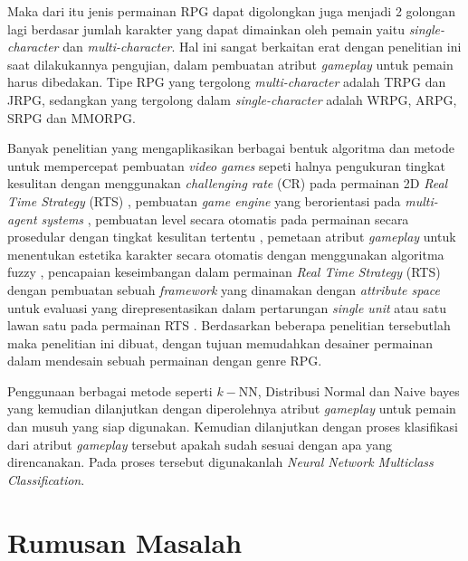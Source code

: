 Maka dari itu jenis permainan RPG dapat digolongkan juga menjadi 2 golongan lagi berdasar jumlah karakter yang dapat dimainkan oleh pemain yaitu \textit{single-character} dan \textit{multi-character}. Hal ini sangat berkaitan erat dengan penelitian ini saat dilakukannya pengujian, dalam pembuatan atribut \textit{gameplay} untuk pemain harus dibedakan. Tipe RPG yang tergolong \textit{multi-character} adalah TRPG dan JRPG, sedangkan yang tergolong dalam \textit{single-character} adalah WRPG, ARPG, SRPG dan MMORPG.
\vspace{1ex}

Banyak penelitian yang mengaplikasikan berbagai bentuk algoritma dan metode untuk mempercepat pembuatan \textit{video games} sepeti halnya pengukuran tingkat kesulitan dengan menggunakan \textit{challenging rate} (CR) pada permainan 2D \textit{Real Time Strategy} (RTS) \citep{Christyowidiasmoro2016}, pembuatan \textit{game engine} yang berorientasi pada \textit{multi-agent systems} \citep{Marin-Lora2020}, pembuatan level secara otomatis pada permainan secara prosedular dengan tingkat kesulitan tertentu \citep{Wu2018}, pemetaan atribut \textit{gameplay} untuk menentukan estetika karakter secara otomatis dengan menggunakan algoritma fuzzy \citep{camelo2014}, pencapaian keseimbangan dalam permainan \textit{Real Time Strategy} (RTS) dengan pembuatan sebuah \textit{framework} yang dinamakan dengan \textit{attribute space} untuk evaluasi yang direpresentasikan dalam pertarungan \textit{single unit} atau satu lawan satu pada permainan RTS \citep{Bangay2014}. Berdasarkan beberapa penelitian tersebutlah maka penelitian ini dibuat, dengan tujuan memudahkan desainer permainan dalam mendesain sebuah permainan dengan genre RPG.
\vspace{1ex}

Penggunaan berbagai metode seperti $k-$NN, Distribusi Normal dan Naive bayes yang kemudian dilanjutkan dengan diperolehnya atribut \textit{gameplay} untuk pemain dan musuh yang siap digunakan. Kemudian dilanjutkan dengan proses klasifikasi dari atribut \textit{gameplay} tersebut apakah sudah sesuai dengan apa yang direncanakan. Pada proses tersebut digunakanlah \textit{Neural Network Multiclass Classification}.
\vspace{1ex}

\section{Rumusan Masalah}
\vspace{1ex}

